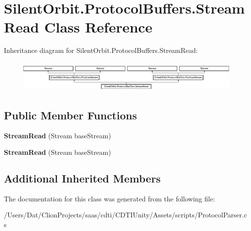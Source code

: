 \hypertarget{class_silent_orbit_1_1_protocol_buffers_1_1_stream_read}{}\section{Silent\+Orbit.\+Protocol\+Buffers.\+Stream\+Read Class Reference}
\label{class_silent_orbit_1_1_protocol_buffers_1_1_stream_read}
Inheritance diagram for Silent\+Orbit.\+Protocol\+Buffers.\+Stream\+Read\+:\begin{figure}[H]
\begin{center}
\leavevmode
\includegraphics[height=1.627907cm]{class_silent_orbit_1_1_protocol_buffers_1_1_stream_read}
\end{center}
\end{figure}
\subsection*{Public Member Functions}
\begin{DoxyCompactItemize}
\item 
{\bfseries Stream\+Read} (Stream base\+Stream)\hypertarget{class_silent_orbit_1_1_protocol_buffers_1_1_stream_read_a79f15b6f4801903fe6f4043e89d1b932}{}\label{class_silent_orbit_1_1_protocol_buffers_1_1_stream_read_a79f15b6f4801903fe6f4043e89d1b932}

\item 
{\bfseries Stream\+Read} (Stream base\+Stream)\hypertarget{class_silent_orbit_1_1_protocol_buffers_1_1_stream_read_a79f15b6f4801903fe6f4043e89d1b932}{}\label{class_silent_orbit_1_1_protocol_buffers_1_1_stream_read_a79f15b6f4801903fe6f4043e89d1b932}

\end{DoxyCompactItemize}
\subsection*{Additional Inherited Members}


The documentation for this class was generated from the following file\+:\begin{DoxyCompactItemize}
\item 
/\+Users/\+Dat/\+Clion\+Projects/saas/cdti/\+C\+D\+T\+I\+Unity/\+Assets/scripts/Protocol\+Parser.\+cs\end{DoxyCompactItemize}
